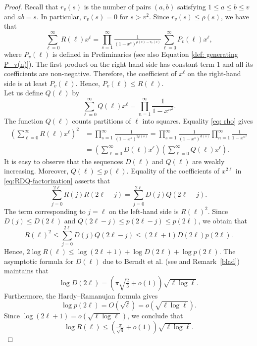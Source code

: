 \documentclass[12pt,a4paper]{amsart}
\numberwithin{equation}{section}
\theoremstyle{plain}
\theoremstyle{definition}
\theoremstyle{remark}
\begin{document}
\begin{proof}
Recall that $r_v(s)$ is the number of pairs $(a,b)$ satisfying $1\le  a\le  b\le  v$ and $ab=s$. In particular, $r_v(s)=0$ for $s>v^2$. %
Since $r_v(s)\le \rho(s)$, we have that
$$
\sum_{\ell=0}^{\infty}R(\ell)x^\ell
=
\prod_{s=1}^{\infty}\tfrac{1}{(1-x^s)^{\rho(s)-r_v(s)}}
\sum_{\ell=0}^{\infty}P_v(\ell)x^\ell,
$$
where $P_v(\ell)$ is defined in Preliminaries (see also Equation \eqref{def: generating P_v(n)}). The first product on the right-hand side has constant term $1$ and all its coefficients are non-negative. Therefore, the coefficient of $x^\ell$ on the right-hand side is at least $P_v(\ell)$. %
Hence, $P_v(\ell)\le  R(\ell)$.\\
Let us define $Q(\ell)$ by 
$$\sum_{\ell=0}^{\infty}Q(\ell)x^\ell=\prod_{n=1}^{\infty}\frac{1}{1-x^{n^2}}.$$
The function $Q(\ell)$ counts partitions of $\ell$ into squares. Equality \eqref{eq: rho} gives
\begin{equation}\label{eq:RDQ-factorization}
\begin{aligned}
\left(\sum_{\ell=0}^{\infty}R(\ell)x^\ell\right)^2
&=
\prod_{s=1}^{\infty}\frac{1}{(1-x^s)^{2\rho(s)}}=
\prod_{s=1}^{\infty}\frac{1}{(1-x^s)^{d(s)}}
\prod_{n=1}^{\infty}\frac{1}{1-x^{n^2}}\\
&=
\left(\sum_{\ell=0}^{\infty}D(\ell)x^\ell\right)
\left(\sum_{\ell=0}^{\infty}Q(\ell)x^\ell\right).
\end{aligned}
\end{equation}
It is easy to observe that the sequences $D(\ell)$ and $Q(\ell)$ are weakly increasing. %
Moreover, $Q(\ell)\le  p(\ell)$. 
Equality of the coefficients of $x^{2\ell}$ in \eqref{eq:RDQ-factorization} asserts that
\begin{equation}\label{RDQrec}
\sum_{j=0}^{2\ell}R(j)R(2\ell-j)
=
\sum_{j=0}^{2\ell}D(j)Q(2\ell-j).
\end{equation}
The term corresponding to $j=\ell$ on the left-hand side is $R(\ell)^2$. Since $D(j)\le  D(2\ell)$ and $Q(2\ell-j)\le p(2\ell-j)\le p(2\ell)$, we obtain that
$$
R(\ell)^2
\le 
\sum_{j=0}^{2\ell}D(j)Q(2\ell-j)
\le 
(2\ell+1)D(2\ell)p(2\ell).
$$
Hence, $2\log R(\ell)\le \log(2\ell+1)+\log D(2\ell)+\log p(2\ell)$. The asymptotic formula for $D(\ell)$ due to Berndt et al. (see \cite[Equations (4.13) and~(4.14)]{BerndtRoblesZaharescuZeindler} and Remark~\ref{blad}) maintains that 
$$\log D(2\ell)=\left(\pi\sqrt{\tfrac{2}{3}}+o(1)\right)\sqrt{\ell\log \ell}.$$
Furthermore, the Hardy--Ramanujan formula gives $$\log p(2\ell)=O(\sqrt \ell)=o(\sqrt{\ell\log \ell}).$$ Since $\log(2\ell+1)=o(\sqrt{\ell\log \ell})$, we conclude that
$$
\log R(\ell)
\le 
\left(\tfrac{\pi}{\sqrt6}+o(1)\right)\sqrt{\ell\log \ell}.
$$
\end{proof}
\end{document}
